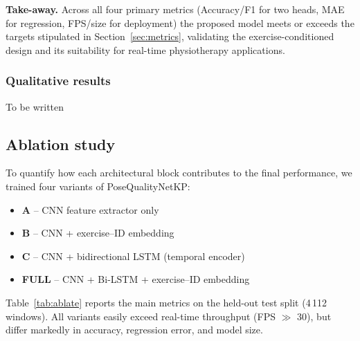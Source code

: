 \documentclass{article}
\begin{document}
\begin{enumerate}[label=\textbf{\Alph*.}, leftmargin=2em, itemsep=6pt]
\bigskip
\noindent
\textbf{Take-away.}  Across all four primary metrics
(Accuracy\slash F1 for two heads, MAE for regression, FPS\slash size for
deployment) the proposed model meets or exceeds the targets stipulated in
Section~\ref{sec:metrics}, validating the exercise-conditioned design and
its suitability for real-time physiotherapy applications.



\subsubsection{Qualitative results}  %
\label{sec:qual}

To be written

\subsection{Ablation study}
\label{sec:ablation}

To quantify how each architectural block contributes to the final
performance, we trained four variants of PoseQualityNetKP:

\begin{itemize}[leftmargin=1.5em]
  \item \textbf{A} – CNN feature extractor only  
  \item \textbf{B} – CNN + exercise–ID embedding  
  \item \textbf{C} – CNN + bidirectional LSTM (temporal encoder)  
  \item \textbf{FULL} – CNN + Bi-LSTM + exercise–ID embedding
\end{itemize}

Table~\ref{tab:ablate} reports the main metrics on the held-out test
split (\mbox{4\,112} windows).  All variants easily exceed real-time
throughput (FPS $\gg$ 30), but differ markedly in accuracy, regression
error, and model size.


\end{enumerate}
\end{document}
